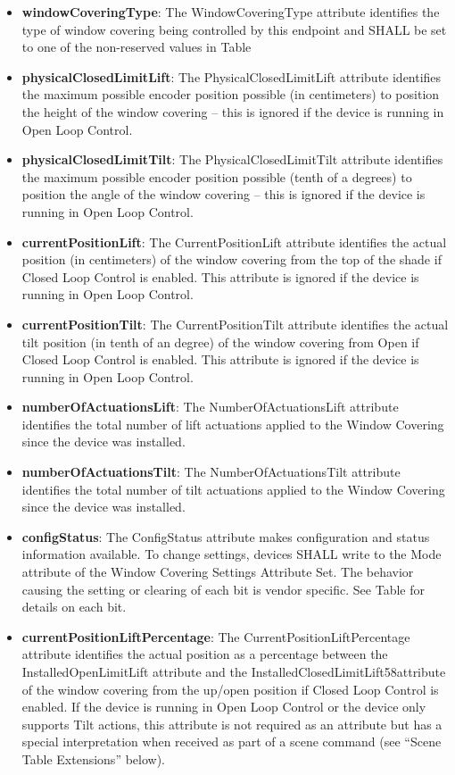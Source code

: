 \begin{itemize}
\item \textbf{windowCoveringType}: The WindowCoveringType attribute identifies the type of window covering being controlled by this endpoint and SHALL be set to one of the non-reserved values in Table
\item \textbf{physicalClosedLimitLift}: The PhysicalClosedLimitLift attribute identifies the maximum possible encoder position possible (in centimeters) to position the height of the window covering – this is ignored if the device is running in Open Loop Control.
\item \textbf{physicalClosedLimitTilt}: The PhysicalClosedLimitTilt attribute identifies the maximum possible encoder position possible (tenth of a degrees) to position the angle of the window covering – this is ignored if the device is running in Open Loop Control.
\item \textbf{currentPositionLift}: The CurrentPositionLift attribute identifies the actual position (in centimeters) of the window covering from the top of the shade if Closed Loop Control is enabled. This attribute is ignored if the device is running in Open Loop Control.
\item \textbf{currentPositionTilt}: The CurrentPositionTilt attribute identifies the actual tilt position (in tenth of an degree) of the window covering from Open if Closed Loop Control is enabled. This attribute is ignored if the device is running in Open Loop Control.
\item \textbf{numberOfActuationsLift}: The NumberOfActuationsLift attribute identifies the total number of lift actuations applied to the Window Covering since the device was installed.
\item \textbf{numberOfActuationsTilt}: The NumberOfActuationsTilt attribute identifies the total number of tilt actuations applied to the Window Covering since the device was installed.
\item \textbf{configStatus}: The ConfigStatus attribute makes configuration and status information available. To change settings, devices SHALL write to the Mode attribute of the Window Covering Settings Attribute Set. The behavior causing the setting or clearing of each bit is vendor specific. See Table for details on each bit.
\item \textbf{currentPositionLiftPercentage}: The CurrentPositionLiftPercentage attribute identifies the actual position as a percentage between the InstalledOpenLimitLift attribute and the InstalledClosedLimitLift58attribute of the window covering from the up/open position if Closed Loop Control is enabled. If the device is running in Open Loop Control or the device only supports Tilt actions, this attribute is not required as an attribute but has a special interpretation when received as part of a scene command (see “Scene Table Extensions” below).

\end{itemize}

